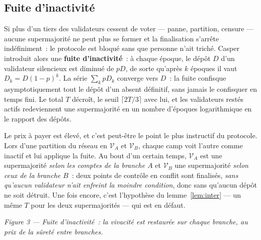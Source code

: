 \documentclass[11pt,a4paper]{article}
\theoremstyle{plain}
\theoremstyle{definition}
\newcommand{\Vv}{\mathcal{V}}
\begin{document}
\subsection{Fuite d'inactivité}

Si plus d'un tiers des validateurs cessent de voter — panne, partition, censure — aucune
supermajorité ne peut plus se former et la finalisation s'arrête indéfiniment~: le protocole
est bloqué sans que personne n'ait triché. Casper introduit alors une \textbf{fuite
d'inactivité}~: à chaque époque, le dépôt $D$ d'un validateur silencieux est diminué de
$pD$, de sorte qu'après $k$ époques il vaut $D_k=D(1-p)^k$. La série $\sum_k pD_k$ converge
vers $D$~: la fuite confisque asymptotiquement tout le dépôt d'un absent définitif, sans
jamais le confisquer en temps fini. Le total $T$ décroît, le seuil $\lceil 2T/3\rceil$ avec
lui, et les validateurs restés actifs redeviennent une supermajorité en un nombre d'époques
logarithmique en le rapport des dépôts.

Le prix à payer est élevé, et c'est peut-être le point le plus instructif du protocole. Lors
d'une partition du réseau en $\Vv_A$ et $\Vv_B$, chaque camp voit l'autre comme inactif et lui
applique la fuite. Au bout d'un certain temps, $\Vv_A$ est une supermajorité \emph{selon les
comptes de la branche $A$} et $\Vv_B$ une supermajorité \emph{selon ceux de la branche $B$}~:
deux points de contrôle en conflit sont finalisés, \emph{sans qu'aucun validateur n'ait
enfreint la moindre condition}, donc sans qu'aucun dépôt ne soit détruit. Une fois encore,
c'est l'hypothèse du lemme~\ref{lem:inter} — un même $T$ pour les deux supermajorités — qui
est en défaut.

\begin{center}

{\footnotesize\itshape Figure 3 --- Fuite d'inactivité~: la vivacité est restaurée sur chaque
branche, au prix de la sûreté entre branches.}
\end{center}
\end{document}
